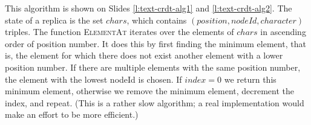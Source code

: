 \begin{frame}
\begin{center}
    \end{center}
\end{frame}
\label{l:text-crdt}

This algorithm is shown on Slides \ref{l:text-crdt-alg1} and \ref{l:text-crdt-alg2}.
The state of a replica is the set $\mathit{chars}$, which contains $(\mathit{position}, \mathit{nodeId}, \mathit{character})$ triples.
The function \textsc{ElementAt} iterates over the elements of $\mathit{chars}$ in ascending order of position number.
It does this by first finding the minimum element, that is, the element for which there does not exist another element with a lower position number.
If there are multiple elements with the same position number, the element with the lowest nodeId is chosen.
If $\mathit{index}=0$ we return this minimum element, otherwise we remove the minimum element, decrement the index, and repeat.
(This is a rather slow algorithm; a real implementation would make an effort to be more efficient.)

